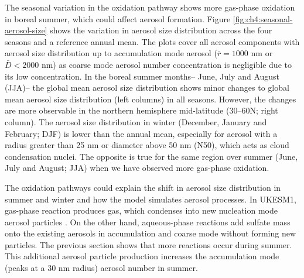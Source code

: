 The seasonal variation in the oxidation pathway shows more gas-phase oxidation in boreal summer, which could affect aerosol formation. Figure \ref{fig:ch4:seasonal-aerosol-size} shows the variation in aerosol size distribution across the four seasons and a reference annual mean. The plots cover all aerosol components with aerosol size distribution up to accumulation mode aerosol ($\bar{r} = 1000$ \unit{\nano\metre} or $\bar{D} < 2000$ \unit{\nano\metre}) as coarse mode aerosol number concentration is negligible due to its low concentration. In the boreal summer months-- June, July and August (JJA)-- the global mean aerosol size distribution shows minor changes to global mean aerosol size distribution (left columns) in all seasons. However, the changes are more observable in the northern hemisphere mid-latitude (30\textdegree--60\textdegree N; right column). The aerosol size distribution in winter (December, January and February; DJF) is lower than the annual mean, especially for aerosol with a radius greater than 25 \unit{\nano\metre} or diameter above 50 \unit{\nano\metre} (N50), which acts as cloud condensation nuclei. The opposite is true for the same region over summer (June, July and August; JJA) when we have observed more gas-phase oxidation.


The  oxidation pathways could explain the shift in aerosol size distribution in summer and winter and how the model simulates aerosol processes. In UKESM1,  gas-phase reaction produces  gas, which condenses into new nucleation mode aerosol particles \citep{mannDescriptionEvaluationGLOMAPmode2010}. On the other hand,  aqueous-phase reactions add sulfate mass onto the existing aerosols in accumulation and coarse mode without forming new particles. The previous section shows that more  reactions occur during summer. This additional aerosol particle production increases the accumulation mode (peaks at a 30 nm radius) aerosol number in summer. 


